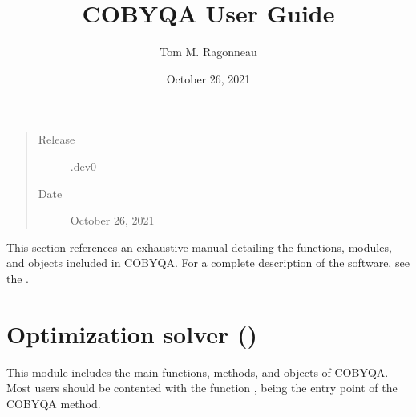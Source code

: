 \documentclass[letterpaper,10pt,english]{sphinxmanual}
\title{COBYQA User Guide}
\date{October 26, 2021}
\author{Tom M. Ragonneau}
\begin{document}
\pagestyle{empty}
\sphinxmaketitle
\pagestyle{plain}
\sphinxtableofcontents
\pagestyle{normal}
\label{\detokenize{refs/index::doc}}

\begin{quote}\begin{description}
\item[{Release}] \leavevmode
{}.dev0

\item[{Date}] \leavevmode
\sphinxAtStartPar
October 26, 2021

\end{description}\end{quote}

\sphinxAtStartPar
This section references an exhaustive manual detailing the functions, modules,
and objects included in COBYQA. For a complete description of the software, see
the .
\label{\detokenize{refs/optimize:module-cobyqa}}

\chapter{Optimization solver ()}
\label{\detokenize{refs/optimize:optimization-solver-cobyqa}}\label{\detokenize{refs/optimize::doc}}
\sphinxAtStartPar
This module includes the main functions, methods, and objects of COBYQA. Most
users should be contented with the function {\hyperref[\detokenize{refs/generated/cobyqa.minimize:cobyqa.minimize}]{}}, being the entry
point of the COBYQA method.
\end{document}
